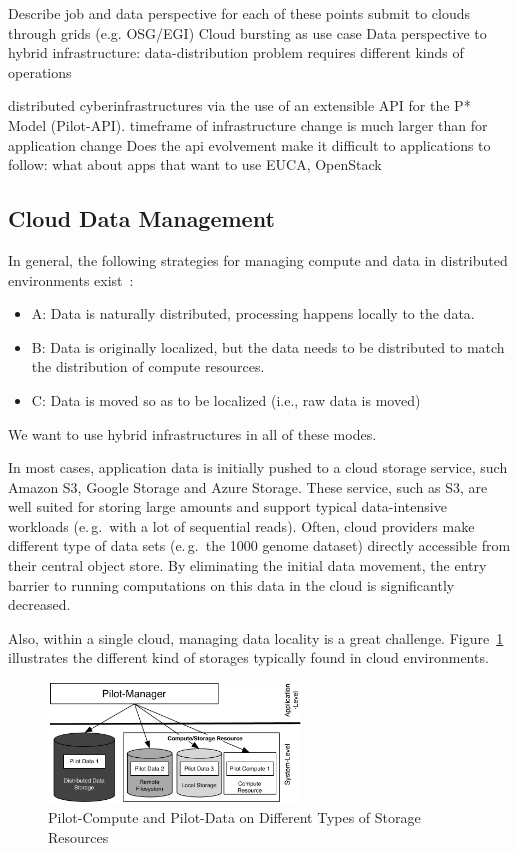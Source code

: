 \documentclass[times]{cpeauth}
\begin{document}
Describe job and data perspective for each of these points
submit to clouds through grids (e.g. OSG/EGI)
Cloud bursting as use case
Data perspective to hybrid infrastructure: data-distribution problem requires different kinds of operations

distributed cyberinfrastructures via the use of an extensible API for the P* Model (Pilot-API).
timeframe of infrastructure change is much larger than for application change
Does the api evolvement make it difficult to applications to follow: what 
about apps that want to use EUCA, OpenStack


\subsection{Cloud Data Management}

In general, the following strategies for managing compute and
data in distributed environments exist~\cite{jha-katz-2013}:
\begin{itemize}
\item A: Data is naturally distributed, processing happens locally to the data. 
\item B: Data is originally localized, but the data needs to be distributed to match the distribution of compute resources.
\item C: Data is moved so as to be localized (i.e., raw data is moved)
\end{itemize}
We want to use hybrid infrastructures in all of these modes.

In most cases, application data is initially pushed to a cloud storage
service, such Amazon S3, Google Storage and Azure Storage. These service, such
as S3, are well suited for storing large amounts and support typical
data-intensive workloads (e.\,g.\ with a lot of sequential reads). Often,
cloud providers make different type of data sets (e.\,g.\ the 1000 genome
dataset) directly accessible from their central object store. By eliminating
the initial data movement, the entry barrier to running computations on this
data in the cloud is significantly decreased.

Also, within a single cloud, managing data locality is a great challenge. 
Figure~\ref{fig:figures_storage-types} illustrates the different kind of 
storages typically found in cloud environments. 
\begin{figure}[t]
	\centering
		\includegraphics[width=0.6\textwidth]{figures/storage-types.pdf}
	\caption{Pilot-Compute and Pilot-Data on Different Types of Storage Resources}
	\label{fig:figures_storage-types}
\end{figure}
\end{document}
